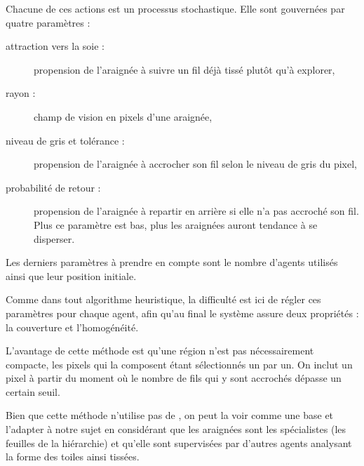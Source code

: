 Chacune de ces actions est un processus stochastique. Elle sont gouvernées par quatre paramètres :
\begin{description}
  \item[attraction vers la soie :] propension de l'araignée à suivre un fil déjà tissé plutôt qu'à explorer,
  \item[rayon :] champ de vision en pixels d'une araignée,
  \item[niveau de gris et tolérance :] propension de l'araignée à accrocher son fil selon le niveau de gris du pixel,
  \item[probabilité de retour :] propension de l'araignée à repartir en arrière si elle n'a pas accroché son fil. Plus ce paramètre est bas, plus les araignées auront tendance à se disperser.
\end{description}
Les derniers paramètres à prendre en compte sont le nombre d'agents utilisés ainsi que leur position initiale.

Comme dans tout algorithme heuristique, la difficulté est ici de régler ces paramètres pour chaque agent, afin qu'au final le système assure deux propriétés : la couverture et l'homogénéité.

L'avantage de cette méthode est qu'une région n'est pas nécessairement compacte, les pixels qui la composent étant sélectionnés un par un. On inclut un pixel à partir du moment où le nombre de fils qui y sont accrochés dépasse un certain seuil.

Bien que cette méthode n'utilise pas de \smahLong{}, on peut la voir comme une base et l'adapter à notre sujet en considérant que les araignées sont les spécialistes (les \og{}feuilles \fg{} de la hiérarchie) et qu'elle sont supervisées par d'autres agents analysant la forme des toiles ainsi tissées.

